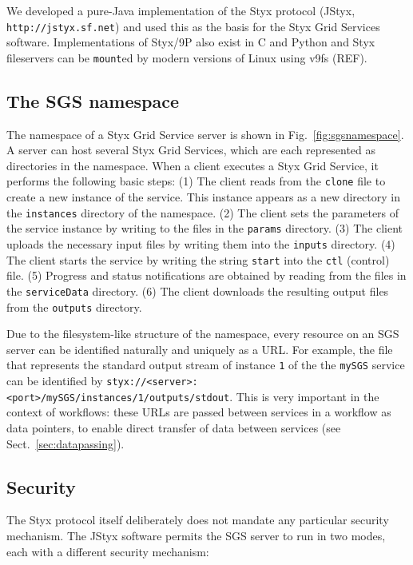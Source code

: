 \documentclass[a4paper]{article}
\begin{document}
We developed a pure-Java implementation of the Styx protocol (JStyx, \texttt{http://jstyx.sf.net}) and used this as the basis for the Styx Grid Services software.  Implementations of Styx/9P also exist in C and Python and Styx fileservers can be \texttt{mount}ed by modern versions of Linux using v9fs (REF).

\subsection{The SGS namespace}\label{sec:sgsnamespace}
The namespace of a Styx Grid Service server is shown in Fig.~\ref{fig:sgsnamespace}.  A server can host several Styx Grid Services, which are each represented as directories in the namespace.  When a client executes a Styx Grid Service, it performs the following basic steps: (1) The client reads from the \texttt{clone} file to create a new instance of the service.  This instance appears as a new directory in the \texttt{instances} directory of the namespace.  (2) The client sets the parameters of the service instance by writing to the files in the \texttt{params} directory.  (3) The client uploads the necessary input files by writing them into the \texttt{inputs} directory.  (4) The client starts the service by writing the string \texttt{start} into the \texttt{ctl} (control) file.  (5) Progress and status notifications are obtained by reading from the files in the \texttt{serviceData} directory.  (6) The client downloads the resulting output files from the \texttt{outputs} directory.

Due to the filesystem-like structure of the namespace, every resource on an SGS server can be identified naturally and uniquely as a URL.  For example, the file that represents the standard output stream of instance \texttt{1} of the the \texttt{mySGS} service can be identified by \texttt{styx://<server>:<port>/mySGS/instances/1/outputs/stdout}.  This is very important in the context of workflows: these URLs are passed between services in a workflow as data pointers, to enable direct transfer of data between services (see Sect.~\ref{sec:datapassing}).

\subsection{Security}
The Styx protocol itself deliberately does not mandate any particular security mechanism.  The JStyx software permits the SGS server to run in two modes, each with a different security mechanism:
\end{document}
